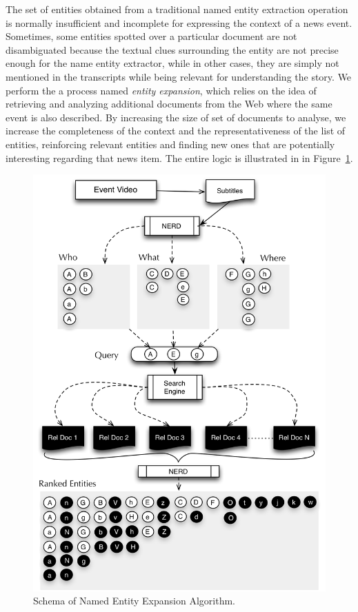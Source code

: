 \documentclass{llncs}
\begin{document}
The set of entities obtained from a traditional named entity extraction operation is normally insufficient and incomplete for expressing the context of a news event. Sometimes, some entities spotted over a particular document are not disambiguated because the textual clues surrounding the entity are not precise enough for the name entity extractor, while in other cases, they are simply not mentioned in the transcripts while being relevant for understanding the story. We perform the a process named \emph{entity expansion}, which relies on the idea of retrieving and analyzing additional documents from the Web where the same event is also described. By increasing the size of set of documents to analyse, we increase the completeness of the context and the representativeness of the list of entities, reinforcing relevant entities and finding new ones that are potentially interesting regarding that news item. The entire logic is illustrated in in Figure~\ref{fig:namedEntityExpansion}.

\begin{figure}[t!]
\centering
\includegraphics[width=1\textwidth]{figure/ExpansionDiagram}
\caption{Schema of Named Entity Expansion Algorithm.}
\label{fig:namedEntityExpansion}%
\end{figure}
\end{document}
